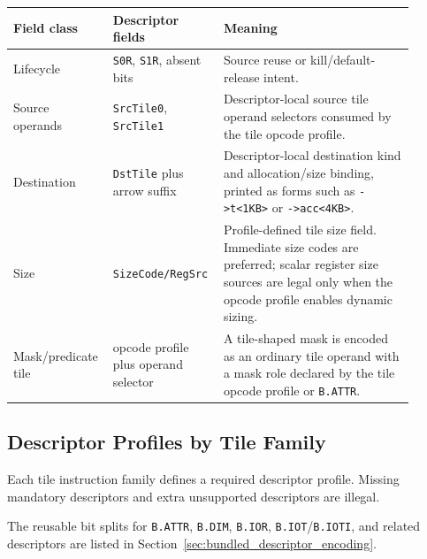 \begin{longtable}{@{}L{0.20\linewidth}L{0.24\linewidth}L{0.46\linewidth}@{}}
\toprule
Field class & Descriptor fields & Meaning \\
\midrule
Lifecycle & \texttt{S0R}, \texttt{S1R}, absent bits & Source reuse or kill/default-release intent. \\
Source operands & \texttt{SrcTile0}, \texttt{SrcTile1} & Descriptor-local source tile operand selectors consumed by the tile opcode profile. \\
Destination & \texttt{DstTile} plus arrow suffix & Descriptor-local destination kind and allocation/size binding, printed as forms such as \texttt{->t<1KB>} or \texttt{->acc<4KB>}. \\
Size & \texttt{SizeCode/RegSrc} & Profile-defined tile size field. Immediate size codes are preferred; scalar register size sources are legal only when the opcode profile enables dynamic sizing. \\
Mask/predicate tile & opcode profile plus operand selector & A tile-shaped mask is encoded as an ordinary tile operand with a mask role declared by the tile opcode profile or \texttt{B.ATTR}. \\
\bottomrule
\end{longtable}

\subsection{Descriptor Profiles by Tile Family}
\label{sec:tile_descriptor_profiles}
Each tile instruction family defines a required descriptor profile. Missing mandatory descriptors and extra unsupported descriptors are illegal.

The reusable bit splits for \texttt{B.ATTR}, \texttt{B.DIM}, \texttt{B.IOR}, \texttt{B.IOT}/\texttt{B.IOTI}, and related descriptors are listed in Section~\ref{sec:bundled_descriptor_encoding}.

